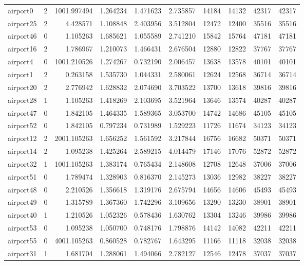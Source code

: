 \begin{longtable}{|l|r|r|r|r|r|r|r|r|r|}
airport0 & 2 & 1001.997494 & 1.264234 & 1.471623 & 2.735857 & 14184 & 14132 & 42317 & 42317 \\
airport25 & 2 & 4.428571 & 1.108848 & 2.403956 & 3.512804 & 12472 & 12400 & 35516 & 35516 \\
airport46 & 0 & 1.105263 & 1.685621 & 1.055589 & 2.741210 & 15842 & 15764 & 47181 & 47181 \\
airport16 & 2 & 1.786967 & 1.210073 & 1.466431 & 2.676504 & 12880 & 12822 & 37767 & 37767 \\
airport4 & 0 & 1001.210526 & 1.274267 & 0.732190 & 2.006457 & 13638 & 13578 & 40101 & 40101 \\
airport1 & 2 & 0.263158 & 1.535730 & 1.044331 & 2.580061 & 12624 & 12568 & 36714 & 36714 \\
airport20 & 2 & 2.776942 & 1.628832 & 2.074690 & 3.703522 & 13700 & 13618 & 39816 & 39816 \\
airport28 & 1 & 1.105263 & 1.418269 & 2.103695 & 3.521964 & 13646 & 13574 & 40287 & 40287 \\
airport47 & 0 & 1.842105 & 1.464335 & 1.589365 & 3.053700 & 14742 & 14686 & 45105 & 45105 \\
airport52 & 0 & 1.842105 & 0.797234 & 0.731989 & 1.529223 & 11726 & 11674 & 34123 & 34123 \\
airport12 & 2 & 2001.105263 & 1.656252 & 1.561592 & 3.217844 & 16756 & 16682 & 50371 & 50371 \\
airport14 & 2 & 1.095238 & 1.425264 & 2.589215 & 4.014479 & 17146 & 17076 & 52872 & 52872 \\
airport32 & 1 & 1001.105263 & 1.383174 & 0.765434 & 2.148608 & 12708 & 12648 & 37006 & 37006 \\
airport51 & 0 & 1.789474 & 1.328903 & 0.816370 & 2.145273 & 13036 & 12982 & 38227 & 38227 \\
airport48 & 0 & 2.210526 & 1.356618 & 1.319176 & 2.675794 & 14656 & 14606 & 45493 & 45493 \\
airport49 & 0 & 1.315789 & 1.367360 & 1.742296 & 3.109656 & 13290 & 13230 & 38901 & 38901 \\
airport40 & 1 & 1.210526 & 1.052326 & 0.578436 & 1.630762 & 13304 & 13246 & 39986 & 39986 \\
airport53 & 0 & 1.095238 & 1.050700 & 0.748176 & 1.798876 & 14142 & 14082 & 42211 & 42211 \\
airport55 & 0 & 4001.105263 & 0.860528 & 0.782767 & 1.643295 & 11166 & 11118 & 32038 & 32038 \\
airport31 & 1 & 1.681704 & 1.288061 & 1.494066 & 2.782127 & 12546 & 12478 & 37037 & 37037 \\

\end{longtable}
